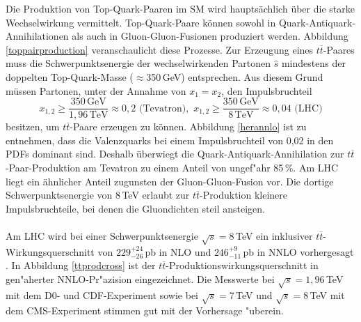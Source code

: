 Die Produktion von Top-Quark-Paaren im SM wird haupts\"achlich \"uber die starke Wechselwirkung vermittelt. Top-Quark-Paare k\"onnen sowohl in Quark-Antiquark-Annihilationen als auch in Gluon-Gluon-Fusionen produziert werden. Abbildung \ref{toppairproduction} veranschaulicht diese Prozesse. Zur Erzeugung eines $t\overline{t}$-Paares muss die Schwerpunkts\-energie der wechselwirkenden Partonen $\hat{s}$ mindestens der doppelten Top-Quark-Masse ($\approx$350\,GeV) entsprechen. Aus diesem Grund m\"ussen Partonen, unter der Annahme von $x_{1}=x_{2}$, den Impulsbruchteil
\begin{equation}
x_{1,2}\geq \frac{350\,\text{GeV}}{1,96\,\text{TeV}}\approx 0,2 \text{ (Tevatron)},\,\,x_{1,2}\geq \frac{350\,\text{GeV}}{8\,\text{TeV}}\approx 0,04 \text{ (LHC)}
\end{equation}
besitzen, um $t\overline{t}$-Paare erzeugen zu k\"onnen. Abbildung \ref{herannlo} ist zu entnehmen, dass die Valenz\-quarks bei einem Impulsbruchteil von 0,02 in den PDFs dominant sind. Deshalb \"uberwiegt die Quark-Antiquark-Annihilation zur $t\overline{t}$-Paar-Produktion am Tevatron zu ei\-nem Anteil von ungef"ahr 85\,\%. Am LHC liegt ein \"ahnlicher Anteil zugunsten der Gluon-Gluon-Fusion vor. Die dortige Schwerpunkts\-energie von 8\,TeV erlaubt zur $t\overline{t}$-Produktion kleinere Impulsbruchteile, bei denen die Gluondichten steil ansteigen.
\\
\\
Am LHC wird bei einer Schwerpunkts\-energie $\sqrt{s}=8$\,TeV ein inklusiver $t\overline{t}$-Wirkungs\-querschnitt von $229_{-26}^{+24}$\,pb in NLO \cite{Cacciari:2011hy} und $246_{-11}^{+9}$\,pb in NNLO vorhergesagt \cite{Czakon:2013goa}. In Abbildung \ref{ttprodcross} ist der $t\overline{t}$-Produktionswirkungsquerschnitt in gen"aherter NNLO-Pr"azision eingezeichnet. Die Messwerte bei $\sqrt{s}=1,96$\,TeV mit dem D0- und CDF-Experiment sowie bei $\sqrt{s}=7$\,TeV und $\sqrt{s}=8$\,TeV mit dem CMS-Experiment stimmen gut mit der Vorhersage "uberein.\\
\\
